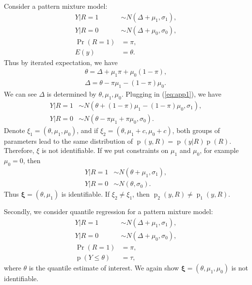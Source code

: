 \documentclass[12pt]{article}
\DeclareMathOperator{\pr}{p}
\DeclareMathOperator{\prob}{Pr}
\begin{document}
Consider a pattern mixture model:
\begin{align}
  Y | R = 1 & \sim N(\Delta + \mu_1, \sigma_1), \label{eq:app1} \\
  Y | R = 0 & \sim N(\Delta + \mu_0, \sigma_0), \nonumber\\
  \prob (R = 1) & = \pi, \nonumber\\
  E (y ) & = \theta. \nonumber
\end{align}
Thus by iterated expectation, we have
\begin{align*}
  \theta = \Delta + \mu_1\pi + \mu_0(1-\pi), \\
  \Delta = \theta - \pi \mu_1 - (1 - \pi)\mu_0.
\end{align*}
We can see $\Delta$ is determined by $\theta, \mu_1, \mu_0$. Plugging
in (\ref{eq:app1}), we have
\begin{align*}
  Y| R = 1 & \sim N(\theta + (1 - \pi)\mu_1 - (1 - \pi)\mu_0, \sigma_1), \\
  Y| R = 0 & \sim N(\theta - \pi \mu_1 + \pi \mu_0, \sigma_0).
\end{align*}
Denote $\xi_1 = (\theta, \mu_1, \mu_0)$, and if $\xi_2 = (\theta,
\mu_1+ c, \mu_0+c)$, both groups of parameters lead to the same
distribution of $\pr(y, R) = \pr(y|R)\pr(R)$. Therefore, $\xi$ is not
identifiable.  If we put constraints on $\mu_1$ and $\mu_0$, for
example $\mu_0 = 0$, then
\begin{align*}
  Y | R = 1 & \sim N(\theta + \mu_1, \sigma_1), \\
  Y | R = 0 & \sim N(\theta, \sigma_0).
\end{align*}
Thus $\bm \xi = (\theta, \mu_1)$ is identifiable. If $\xi_2 \neq
\xi_1$, then $\pr_2(y, R) \neq \pr_1(y, R)$.

Secondly, we consider quantile regression for a pattern mixture model:
\begin{align*}
  Y | R = 1 & \sim N(\Delta + \mu_1, \sigma_1),\\
  Y | R = 0 & \sim N(\Delta + \mu_0, \sigma_0),\\
  \prob (R = 1) & = \pi,\\
  \pr (Y \leq \theta ) & = \tau,
\end{align*}
where $\theta$ is the quantile estimate of interest. We again show
$\bm \xi = (\theta, \mu_1, \mu_0) $ is not identifiable.
\end{document}
